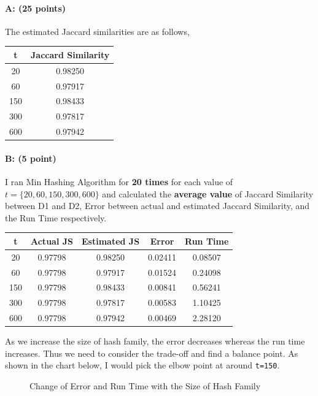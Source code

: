 \documentclass[11pt]{article}
\begin{document}
\paragraph{A: (25 points)}
The estimated Jaccard similarities are as follows,
\begin{table}[h]
\centering
\begin{tabular}{c|c}
t & Jaccard Similarity\\
\hline
20 & 0.98250 \\
60 & 0.97917 \\
150 & 0.98433 \\
300 & 0.97817 \\
600 & 0.97942 \\
\end{tabular}
\end{table}

\paragraph{B: (5 point)}
I ran Min Hashing Algorithm for \textbf{20 times} for each value of $t=\{20, 60, 150, 300, 600\}$ and calculated the \textbf{average value} of Jaccard Similarity between D1 and D2, Error between actual and estimated Jaccard Similarity, and the Run Time respectively.\\
\begin{table}[h]
\centering
\begin{tabular}{c|c|c|c|c}
t & Actual JS & Estimated JS & Error & Run Time\\
\hline
20 & 0.97798 & 0.98250 & 0.02411 & 0.08507 \\
60 & 0.97798 & 0.97917 & 0.01524 & 0.24098 \\
150 & 0.97798 & 0.98433 & 0.00841 & 0.56241 \\
300 & 0.97798 & 0.97817 & 0.00583 & 1.10425 \\
600 & 0.97798 & 0.97942 & 0.00469 & 2.28120 \\
\end{tabular}
\end{table}
As we increase the size of hash family, the error decreases whereas the run time increases. Thus we need to consider the trade-off and find a balance point. As shown in the chart below, I would pick the elbow point at around \texttt{t=150}.
\begin{figure}[H]
\caption{Change of Error and Run Time with the Size of Hash Family}
\label{fig:name}
\end{figure}
\end{document}
